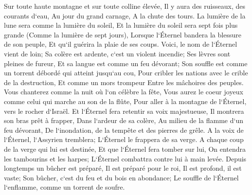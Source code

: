 \verse Sur toute haute montagne et sur toute colline élevée, Il y aura des ruisseaux, des courants d`eau, Au jour du grand carnage, A la chute des tours. 
\verse La lumière de la lune sera comme la lumière du soleil, Et la lumière du soleil sera sept fois plus grande (Comme la lumière de sept jours), Lorsque l`Éternel bandera la blessure de son peuple, Et qu`il guérira la plaie de ses coups. 
\verse Voici, le nom de l`Éternel vient de loin; Sa colère est ardente, c`est un violent incendie; Ses lèvres sont pleines de fureur, Et sa langue est comme un feu dévorant; 
\verse Son souffle est comme un torrent débordé qui atteint jusqu`au cou, Pour cribler les nations avec le crible de la destruction, Et comme un mors trompeur Entre les mâchoires des peuples. 
\verse Vous chanterez comme la nuit où l`on célèbre la fête, Vous aurez le coeur joyeux comme celui qui marche au son de la flûte, Pour aller à la montagne de l`Éternel, vers le rocher d`Israël. 
\verse Et l`Éternel fera retentir sa voix majestueuse, Il montrera son bras prêt à frapper, Dans l`ardeur de sa colère, Au milieu de la flamme d`un feu dévorant, De l`inondation, de la tempête et des pierres de grêle. 
\verse A la voix de l`Éternel, l`Assyrien tremblera; L`Éternel le frappera de sa verge. 
\verse A chaque coup de la verge qui lui est destinée, Et que l`Éternel fera tomber sur lui, On entendra les tambourins et les harpes; L`Éternel combattra contre lui à main levée. 
\verse Depuis longtemps un bûcher est préparé, Il est préparé pour le roi, Il est profond, il est vaste; Son bûcher, c`est du feu et du bois en abondance; Le souffle de l`Éternel l`enflamme, comme un torrent de soufre. 

